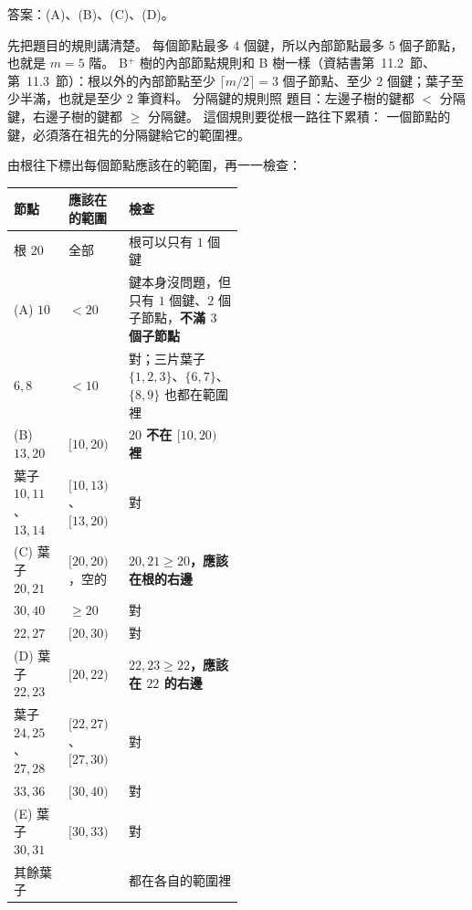\begin{pastsoln}
答案：(A)、(B)、(C)、(D)。

先把題目的規則講清楚。 每個節點最多 $4$ 個鍵，所以內部節點最多 $5$ 個子節點，也就是 $m = 5$ 階。
B$^{+}$ 樹的內部節點規則和 B 樹一樣（資結書第~11.2~節、第~11.3~節）：根以外的內部節點至少
$\lceil m/2 \rceil = 3$ 個子節點、至少 $2$ 個鍵；葉子至少半滿，也就是至少 $2$ 筆資料。 分隔鍵的規則照
題目：左邊子樹的鍵都 $<$ 分隔鍵，右邊子樹的鍵都 $\ge$ 分隔鍵。 這個規則要從根一路往下累積：
一個節點的鍵，必須落在祖先的分隔鍵給它的範圍裡。

由根往下標出每個節點應該在的範圍，再一一檢查：
\begin{center}
\small
\begin{tabular}{ll>{\raggedright\arraybackslash}p{0.5\linewidth}}
\toprule
節點 & 應該在的範圍 & 檢查 \\
\midrule
根 $20$ & 全部 & 根可以只有 $1$ 個鍵 \\
(A) $10$ & $< 20$ & 鍵本身沒問題，但只有 $1$ 個鍵、$2$ 個子節點，\textbf{不滿 $3$ 個子節點} \\
$6, 8$ & $< 10$ & 對；三片葉子 $\{1,2,3\}$、$\{6,7\}$、$\{8,9\}$ 也都在範圍裡 \\
(B) $13, 20$ & $[10, 20)$ & \textbf{$20$ 不在 $[10, 20)$ 裡} \\
葉子 $10,11$、$13,14$ & $[10, 13)$、$[13, 20)$ & 對 \\
(C) 葉子 $20, 21$ & $[20, 20)$，空的 & \textbf{$20, 21 \ge 20$，應該在根的右邊} \\
$30, 40$ & $\ge 20$ & 對 \\
$22, 27$ & $[20, 30)$ & 對 \\
(D) 葉子 $22, 23$ & $[20, 22)$ & \textbf{$22, 23 \ge 22$，應該在 $22$ 的右邊} \\
葉子 $24,25$、$27,28$ & $[22, 27)$、$[27, 30)$ & 對 \\
$33, 36$ & $[30, 40)$ & 對 \\
(E) 葉子 $30, 31$ & $[30, 33)$ & 對 \\
其餘葉子 & & 都在各自的範圍裡 \\
\bottomrule
\end{tabular}
\end{center}


\end{pastsoln}
